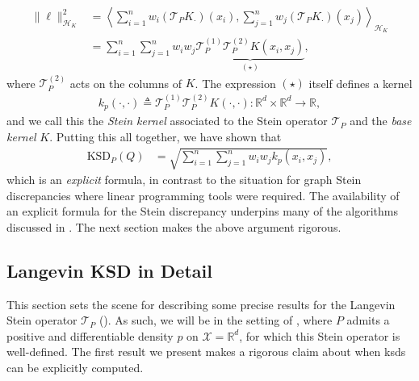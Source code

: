 \documentclass[12pt,paper=letter]{scrreprt}
\def\defeq{\triangleq} %
\begin{document}
\begin{align*}
    \|\ell\|_{\mathcal{H}_K}^2 & = \left\langle \sum_{i=1}^n w_i (\mathcal{T}_P K_{\cdot})(x_i) , \sum_{j=1}^n w_j (\mathcal{T}_P K_{\cdot})(x_j) \right\rangle_{\mathcal{H}_K} \\
    & = \sum_{i=1}^n \sum_{j=1}^n w_i w_j \underbrace{ \mathcal{T}_P^{(1)} \mathcal{T}_P^{(2)} K(x_i,x_j) }_{(\star)} ,
\end{align*}
where $\mathcal{T}_P^{(2)}$ acts on the columns of $K$.
The expression $(\star)$ itself defines a kernel 
\begin{align}\label{eq:general-stein-kernel}
    k_p(\cdot,\cdot) \defeq  \mathcal{T}_P^{(1)} \mathcal{T}_P^{(2)} K(\cdot,\cdot) : \mathbb{R}^d \times \mathbb{R}^d \rightarrow \mathbb{R},
\end{align}
and we call this the \emph{Stein kernel} associated to the Stein operator $\mathcal{T}_P$ and the \emph{base kernel} $K$. 
Putting this all together, we have shown that
\begin{align*}
    \mathrm{KSD}_P(Q) & = \sqrt{ \sum_{i=1}^n \sum_{j=1}^n w_i w_j k_p(x_i,x_j) } ,
\end{align*}
which is an \emph{explicit} formula, in contrast to the situation for graph Stein discrepancies where linear programming tools were required.
The availability of an explicit formula for the Stein discrepancy underpins many of the algorithms discussed in .
The next section makes the above argument rigorous.





\subsection{Langevin KSD in Detail}
\label{subsec: lksd in detail}



This section sets the scene for describing some precise results for the Langevin Stein operator $\mathcal{T}_P$ ().
As such, we will be in the setting of , where $P$ admits a positive and differentiable density $p$ on $\mathcal{X} = \mathbb{R}^d$, for which this Stein operator is well-defined.
The first result we present makes a rigorous claim about when \acp{ksd} can be explicitly computed.
\end{document}
